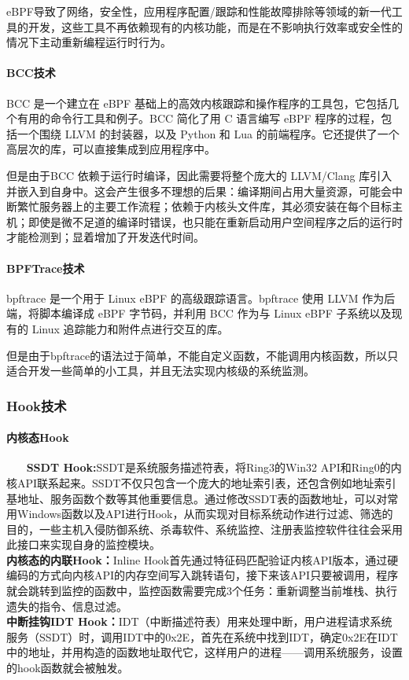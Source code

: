 \documentclass[12pt,a4paper]{ctexart}
\begin{document}
eBPF导致了网络，安全性，应用程序配置/跟踪和性能故障排除等领域的新一代工具的开发，这些工具不再依赖现有的内核功能，而是在不影响执行效率或安全性的情况下主动重新编程运行时行为。

\paragraph{BCC技术}
BCC 是一个建立在 eBPF 基础上的高效内核跟踪和操作程序的工具包，它包括几个有用的命令行工具和例子。BCC 简化了用 C 语言编写 eBPF 程序的过程，包括一个围绕 LLVM 的封装器，以及 Python 和 Lua 的前端程序。它还提供了一个高层次的库，可以直接集成到应用程序中。


但是由于BCC 依赖于运行时编译，因此需要将整个庞大的 LLVM/Clang 库引入并嵌入到自身中。这会产生很多不理想的后果：编译期间占用大量资源，可能会中断繁忙服务器上的主要工作流程；依赖于内核头文件库，其必须安装在每个目标主机；即使是微不足道的编译时错误，也只能在重新启动用户空间程序之后的运行时才能检测到；显着增加了开发迭代时间。

\paragraph{BPFTrace技术}
bpftrace 是一个用于 Linux eBPF 的高级跟踪语言。bpftrace 使用 LLVM 作为后端，将脚本编译成 eBPF 字节码，并利用 BCC 作为与 Linux eBPF 子系统以及现有的 Linux 追踪能力和附件点进行交互的库。


但是由于bpftrace的语法过于简单，不能自定义函数，不能调用内核函数，所以只适合开发一些简单的小工具，并且无法实现内核级的系统监测。

\subsubsection{Hook技术}
\paragraph{内核态Hook}
~~~\newline
\textbf{SSDT Hook:}SSDT是系统服务描述符表，将Ring3的Win32 API和Ring0的内核API联系起来。SSDT不仅只包含一个庞大的地址索引表，还包含例如地址索引基地址、服务函数个数等其他重要信息。通过修改SSDT表的函数地址，可以对常用Windows函数以及API进行Hook，从而实现对目标系统动作进行过滤、筛选的目的，一些主机入侵防御系统、杀毒软件、系统监控、注册表监控软件往往会采用此接口来实现自身的监控模块。\\
\textbf{内核态的内联Hook：}Inline Hook首先通过特征码匹配验证内核API版本，通过硬编码的方式向内核API的内存空间写入跳转语句，接下来该API只要被调用，程序就会跳转到监控的函数中，监控函数需要完成3个任务：重新调整当前堆栈、执行遗失的指令、信息过滤。\\
\textbf{中断挂钩IDT Hook：}IDT（中断描述符表）用来处理中断，用户进程请求系统服务（SSDT）时，调用IDT中的0x2E，首先在系统中找到IDT，确定0x2E在IDT中的地址，并用构造的函数地址取代它，这样用户的进程——调用系统服务，设置的hook函数就会被触发。
\end{document}
